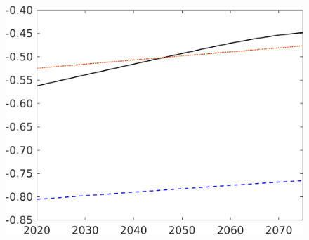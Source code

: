 \begin{figure}[h!!]
\begin{minipage}[]{0.32\textwidth}
	\end{minipage}
	\begin{minipage}[]{0.32\textwidth}
		\includegraphics[width=1\textwidth]{../../codding_model/own_basedOnFried/optimalPol_elastS_DisuSci/figures/all_1705/Extern_CompEff_UtilCon_spillover0_noskill0_sep1_BN0_ineq0_red0_etaa0.79_lgd0.png}
	\end{minipage}
\end{figure}
